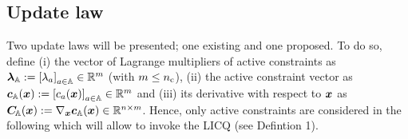 \documentclass[journal]{IEEEtranTIE}
\begin{document}
\subsection{Update law}\label{subsec:iter_law}
Two update laws will be presented; one existing and one proposed. To do so, define (i) the vector of Lagrange multipliers of active constraints as $\boldsymbol{\lambda}_{\mathbb{A}} := \left[ \lambda_a \right]_{a \in \mathbb{A}} \in \mathbb{R}^m$ (with $m \leq n_{\rm c}$), (ii) the active constraint vector as $\boldsymbol{c}_{\mathbb{A}}(\boldsymbol{x}) := \left[ c_a(\boldsymbol{x}) \right]_{a \in \mathbb{A}} \in \mathbb{R}^m$ and (iii) its derivative with respect to $\boldsymbol{x}$ as $\boldsymbol{C}_{\!\mathbb{A}}(\boldsymbol{x}) := \nabla_{\boldsymbol{x}} \boldsymbol{c}_{\mathbb{A}}(\boldsymbol{x}) \in \mathbb{R}^{n \times m}$. Hence, only active constraints are considered in the following which will allow to invoke the LICQ (see Defintion 1).
\end{document}
